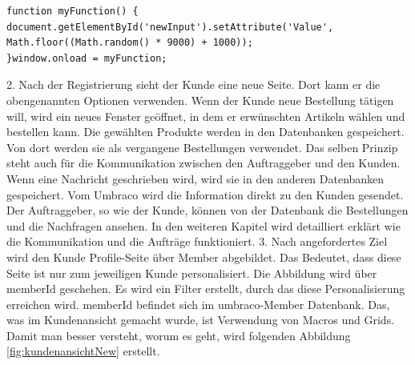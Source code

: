 \begin{lstlisting}[caption={JavaScript PIN Generator}, label=lst:PINgenerator]
function myFunction() {
document.getElementById('newInput').setAttribute('Value', Math.floor((Math.random() * 9000) + 1000));
}window.onload = myFunction;
\end{lstlisting}


2. Nach der Registrierung sieht der Kunde eine neue Seite. Dort kann er die obengenannten Optionen verwenden. 
Wenn der Kunde neue Bestellung tätigen will, wird ein neues Fenster geöffnet, in dem er erwünschten Artikeln wählen und bestellen kann. Die gewählten Produkte werden in den Datenbanken gespeichert. Von dort werden sie als vergangene Bestellungen verwendet. Das selben Prinzip steht auch für die Kommunikation zwischen den Auftraggeber und den Kunden. Wenn eine Nachricht geschrieben wird, wird sie in den anderen Datenbanken gespeichert. 
Vom Umbraco wird die Information direkt zu den Kunden gesendet. 
Der Auftraggeber, so wie der Kunde, können von der Datenbank die Bestellungen und die Nachfragen ansehen. In den weiteren Kapitel wird detailliert erklärt wie die Kommunikation und die Aufträge funktioniert.
3. Nach angefordertes Ziel wird den Kunde Profile-Seite über Member abgebildet. Das Bedeutet, dass diese Seite ist nur zum jeweiligen Kunde personalisiert. Die Abbildung wird über memberId geschehen. Es wird ein Filter erstellt, durch das diese Personalisierung erreichen wird. memberId befindet sich im umbraco-Member Datenbank.
Das, was im Kundenansicht gemacht wurde, ist Verwendung von Macros und Grids. 
Damit man besser versteht, worum es geht, wird folgenden Abbildung \ref{fig:kundenansichtNew} erstellt. 

